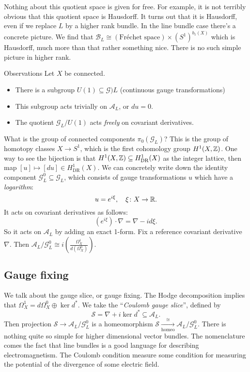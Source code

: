 Nothing about this quotient space is given for free. For example, it is not terribly obvious that this quotient space is Hausdorff. It turns out that it is Hausdorff, even if we replace $L$ by a higher rank bundle. In the line bundle case there's a concrete picture. We find that $\mathcal B_L \cong  (\text{Fr\'echet space} ) \times (S^1 ) ^{b_1(X)}$ which is Hausdorff, much more than that rather something nice. There is no such simple picture in higher rank.

\begin{namedthing}{Observations} 
   Let $X$ be connected.
   \begin{itemize}
   \setlength\itemsep{-.2em}
       \item There is a subgroup  $U(1)  \subseteq \mathcal G)L$ (continuous gauge transformations)
\item This subgroup acts trivially on $\mathcal A_L$, or $du = 0$.
\item The quotient $\mathcal G_L / U(1)$ acts \emph{freely} on covariant derivatives.
   \end{itemize}
\end{namedthing}
What is the group of connected components $\pi_0(\mathcal G_L)$? This is the group of homotopy classes $X \to S^1 $, which is the first cohomology group $H^1(X,\mathbb{Z})$. One way to see the bijection is that $H^1(X,\mathbb{Z}) \subseteq H^1_{\mathrm{DR}}(X)$ as the integer lattice, then map $[u] \mapsto  [du] \in H^1_{\mathrm{DR}}(X)$.
We can concretely write down the identity component $\mathcal G_L^0 \subseteq \mathcal G_L$, which consists of gauge transformations $u$ which have a \emph{logarithm}: \[
u = e^{i\xi},\quad \xi \colon X \to \mathbb{R}.
\] It acts on covariant derivatives as follows:
\[
    \left( e ^{i\xi} \right) \cdot \nabla = \nabla - i d \xi.
\] So it acts on $\mathcal A_L$ by adding an exact 1-form. Fix a reference covariant derivative $\nabla$. Then $\mathcal A_L / \mathcal G^0_L \cong  i\left( \frac{ \Omega^1_X}{ d(\Omega^0_X)} \right) $. 
\subsection{Gauge fixing}
We talk about the gauge slice, or gauge fixing. The Hodge decomposition implies that $\Omega^1_X = d \Omega^0_X \oplus \ker d^*$. We take the ``\emph{Coulomb gauge slice}'', defined by \[
\mathcal S = \nabla + i\ker d^* \subseteq \mathcal A_L.
\] Then projection $\mathcal S \to \mathcal A_L / \mathcal G_L^0$ is a homeomorphism $\mathcal S \xrightarrow[\text{homeo}]{\cong } \mathcal A_L / \mathcal G^0_L $. There is nothing quite so simple for higher dimensional vector bundles. The nomenclature comes the fact that line bundles is a good language for describing electromagnetism. The Coulomb condition measure some condition for measuring the potential of the divergence of some electric field.

